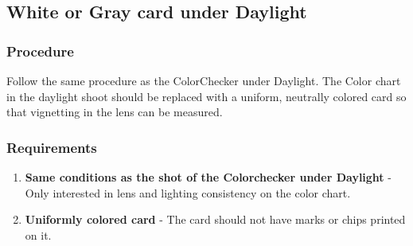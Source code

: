 \documentclass[twoside]{article}
\begin{document}
\subsection{White or Gray card under Daylight}
\subsubsection{Procedure}
Follow the same procedure as the ColorChecker under Daylight. The Color chart in the daylight shoot should be replaced with a uniform, neutrally colored card so that vignetting in the lens can be measured.

\subsubsection{Requirements}
\begin{enumerate}
    \item \textbf{Same conditions as the shot of the Colorchecker under Daylight} - Only interested in lens and lighting consistency on the color chart.
    \item \textbf{Uniformly colored card} - The card should not have marks or chips printed on it.
\end{enumerate}

\end{document}

